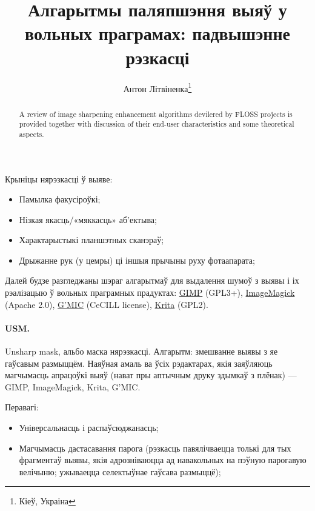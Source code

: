 \documentclass[10pt, a5paper]{article}
\begin{document}
\title{Алгарытмы паляпшэння выяў у вольных праграмах: падвышэнне рэзкасці}%

\author{Антон Літвіненка\footnote{Кіеў, Украіна}}
\maketitle

\begin{abstract}
A review of image sharpening enhancement algorithms devilered by FLOSS projects is provided together with discussion of their end-user characteristics and some theoretical aspects.
\end{abstract}

Крыніцы нярэзкасці ў выяве:
\begin{itemize}
  \item Памылка факусіроўкі;
  \item Нізкая якасць/«мяккасць» аб’ектыва;
  \item Характарыстыкі планшэтных сканэраў;
  \item Дрыжанне рук (у цемры) ці іншыя прычыны руху фотаапарата;
\end{itemize}

Далей будзе разгледжаны шэраг алгарытмаў для выдалення шумоў з выявы і іх рэалізацыю ў вольных праграмных прадуктах: \href{http://www.gimp.org/}{GIMP} (GPL3+), \href{http://www.imagemagick.org/}{ImageMagick} (Apache 2.0), \href{http://gmic.sourceforge.net/}{G’MIC} (CeCILL license), \href{http://krita.org/}{Krita} (GPL2).

\paragraph*{USM.} Unsharp mask, альбо маска нярэзкасці. Алгарытм: змешванне выявы з яе гаўсавым размыццём. Наяўная амаль ва ўсіх рэдактарах, якія заяўляюць магчымасць апрацоўкі выяў (нават пры аптычным друку здымкаў з плёнак) — {GIMP}, {ImageMagick}, {Krita}, {G'MIC}.

Перавагі:

\begin{itemize}
  \item Універсальнасць і распаўсюджанасць;
  \item Магчымасць дастасавання парога (рэзкасць павялічваецца толькі для тых фрагментаў выявы, якія адрозніваюцца ад навакольных на пэўную парогавую велічыню; ужываецца селектыўнае гаўсава размыццё);
\end{itemize}
\end{document}
